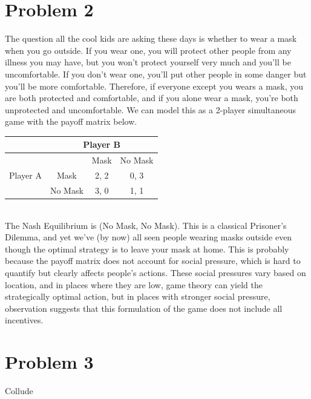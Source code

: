 \documentclass[letterpaper]{article}
\begin{document}
\section{Problem 2}
The question all the cool kids are asking these days is whether to wear a mask when you go outside. If you wear one, you will protect other people from any illness you may have, but you won't protect yourself very much and you'll be uncomfortable. If you don't wear one, you'll put other people in some danger but you'll be more comfortable. Therefore, if everyone except you wears a mask, you are both protected and comfortable, and if you alone wear a mask, you're both unprotected and uncomfortable. We can model this as a 2-player simultaneous game with the payoff matrix below. \\
    \begin{tabular}{|c|c|c|c|}
        \hline
        & \multicolumn{3}{c|}{Player B}       \\ \hline
        \multirow{3}{*}{Player A} & & Mask & No Mask \\ \cline{2-4}
        & Mask  & 2, 2  & 0, 3    \\ \cline{2-4}
        & \multicolumn{1}{c|}{No Mask} & \multicolumn{1}{c|}{3, 0} & 1, 1    \\ \hline
    \end{tabular} \\
    The Nash Equilibrium is (No Mask, No Mask). This is a classical Prisoner's Dilemma, and yet we've (by now) all seen people wearing masks outside even though the optimal strategy is to leave your mask at home. This is probably because the payoff matrix does not account for social pressure, which is hard to quantify but clearly affects people's actions. These social pressures vary based on location, and in places where they are low, game theory can yield the strategically optimal action, but in places with stronger social pressure, observation suggests that this formulation of the game does not include all incentives.
\section{Problem 3}
Collude
\end{document}
